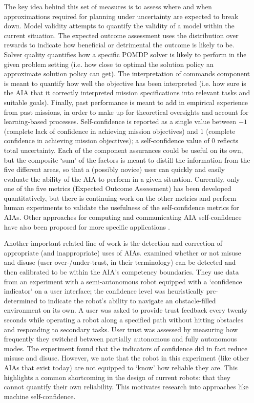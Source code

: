 The key idea behind this set of measures is to assess where and when approximations required for planning under uncertainty are expected to break down. Model validity attempts to quantify the validity of a model within the current situation. The expected outcome assessment uses the distribution over rewards to indicate how beneficial or detrimental the outcome is likely to be. Solver quality quantifies how a specific POMDP solver is likely to perform in the given problem setting (i.e. how close to optimal the solution policy an approximate solution policy can get). 
The interpretation of commands component is meant to quantify how well the objective has been interpreted (i.e. how sure is the AIA that it correctly interpreted mission specifications into relevant tasks and suitable goals). 
Finally, past performance is meant to add in empirical experience from past missions, in order to make up for theoretical oversights and account for learning-based processes. 
Self-confidence is reported as a single value between $-1$ (complete lack of confidence in achieving mission objectives) and $1$ (complete confidence in achieving mission objectives); a self-confidence value of $0$ reflects total uncertainty. 
Each of the component assurances could be useful on its own, but the composite `sum' of the factors is meant to distill the information from the five different areas, so that a (possibly novice) user can quickly and easily evaluate the ability of the AIA to perform in a given situation. 
Currently, only one of the five metrics (Expected Outcome Assessment) has been developed quantitatively, but there is continuing work on the other metrics and perform human experiments to validate the usefulness of the self-confidence metrics for AIAs. Other approaches for computing and communicating AIA self-confidence have also been proposed for more specific applications \cite{Hutchins2015-if, Kaipa2015-hy, Zagorecki2015-qy, Kuter2015-qh}. 

Another important related line of work is the detection and correction of appropriate (and inappropriate) uses of AIAs. 
\citet{Kaniarasu2013-ho} examined whether or not misuse and disuse (user over-/under-trust, in their terminology) can be detected and then calibrated to be within the AIA's competency boundaries. 
They use data from an experiment with a semi-autonomous robot equipped with a `confidence indicator' on a user interface; the confidence level was heuristically pre-determined to indicate the robot's ability to navigate an obstacle-filled environment on its own. 
A user was asked to provide trust feedback every twenty seconds while operating a robot along a specified path without hitting obstacles and responding to secondary tasks. 
User trust was assessed by measuring how frequently they switched between partially autonomous and fully autonomous modes. The experiment found that the indicators of confidence did in fact reduce misuse and disuse. 
However, we note that the robot in this experiment (like other AIAs that exist today) are not equipped to `know' how reliable they are. This highlights a common shortcoming in the design of current robots: that they cannot quantify their own reliability. This motivates research into approaches like machine self-confidence. 

